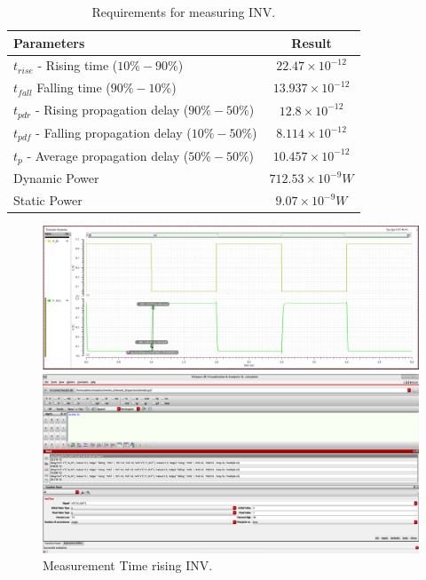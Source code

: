 \begin{table}[H]
	\centering
	\begin{tabular}{|p{.5\linewidth}|c|}
		\hline
		Parameters & Result\\
		\hline
		$t_{rise}$ - Rising time ($10\% - 90\%$) & $22.47\times10^{-12}$\\
		\hline
		$t_{fall}$  Falling time ($90\% - 10\%$) & $13.937\times10^{-12}$\\
		\hline
		$t_{pdr}$ - Rising propagation delay ($90\% - 50\%$) & $12.8\times10^{-12}$\\
		\hline
		$t_{pdf}$ - Falling propagation delay ($10\% - 50\%$) & $8.114\times10^{-12}$\\
		\hline
		$t_{p}$ - Average propagation delay ($50\% - 50\%$) & $10.457\times10^{-12}$\\
		\hline
		Dynamic Power & $712.53\times10^{-9} W$\\
		\hline
		Static Power & $9.07\times10^{-9} W$\\
		\hline
	\end{tabular}
	\caption{Requirements for measuring INV.}
	\label{f_measuring INV}
\end{table}

\begin{figure}[H]
	\begin{minipage}{0.5\linewidth}
		\includegraphics[width=\linewidth]{section/EX1/INV/EX1_INV_Tr_Waveform.png}
	\end{minipage}
	\begin{minipage}{0.5\linewidth}
		\includegraphics[width=\linewidth]{section/EX1/INV/EX1_INV_Tr_Cal.png}
	\end{minipage}
	\caption{Measurement Time rising INV.}
\end{figure}

